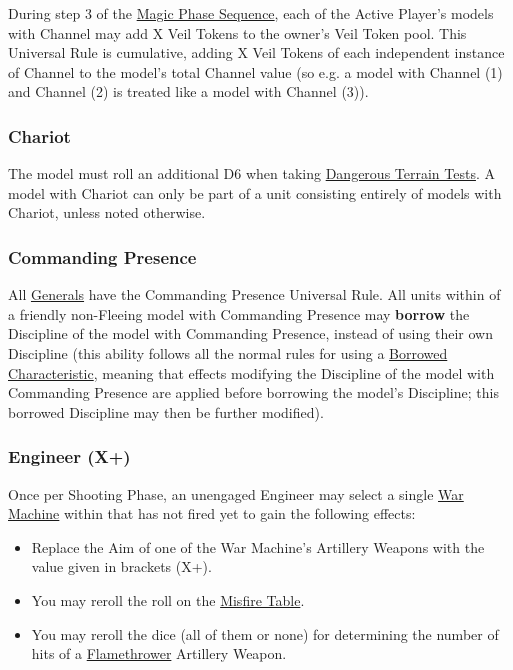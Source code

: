 During step 3 of the \hyperref[magic_phase_sequence]{Magic Phase Sequence}, each of the Active Player's models with Channel may add X Veil Tokens to the owner's Veil Token pool. This Universal Rule is cumulative, adding X Veil Tokens of each independent instance of Channel to the model's total Channel value (so e.g. a model with Channel (1) and Channel (2) is treated like a model with Channel (3)).

\subsubsection{Chariot}
\label{chariot}

The model must roll an additional D6 when taking \hyperref[dangerous_terrain]{Dangerous Terrain Tests}. A model with Chariot can only be part of a unit consisting entirely of models with Chariot, unless noted otherwise.

\subsubsection{Commanding Presence}
\label{commanding_presence}

All \hyperref[the_general]{Generals} have the Commanding Presence Universal Rule. All units within  of a friendly non-Fleeing model with Commanding Presence may \textbf{borrow} the Discipline of the model with Commanding Presence, instead of using their own Discipline (this ability follows all the normal rules for using a \hyperref[using_borrowed_characteristics]{Borrowed Characteristic}, meaning that effects modifying the Discipline of the model with Commanding Presence are applied before borrowing the model's Discipline; this borrowed Discipline may then be further modified).

\subsubsection{Engineer (X+)}
\label{engineer}

Once per Shooting Phase, an unengaged Engineer may select a single \hyperref[war_machine]{War Machine} within  that has not fired yet to gain the following effects:

\begin{itemize}[label={-}]
\item Replace the Aim of one of the War Machine's Artillery Weapons with the value given in brackets (X+).
\item You may reroll the roll on the \hyperref[the_misfire_table]{Misfire Table}.
\item You may reroll the dice (all of them or none) for determining the number of hits of a \hyperref[flamethrower]{Flamethrower} Artillery Weapon.
\end{itemize}


